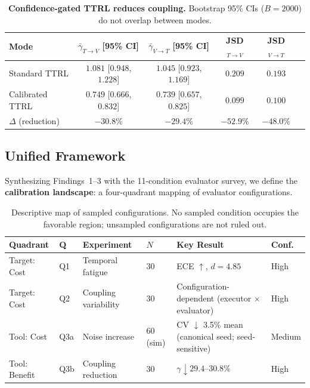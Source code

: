 \documentclass[11pt]{article}
\begin{document}
\begin{table}[H]
\centering
\caption{\textbf{Confidence-gated TTRL reduces coupling.} Bootstrap 95\% CIs ($B{=}2000$) do not overlap between modes.}
\label{tab:coupling}
\begin{tabular}{@{}lccccc@{}}
\toprule
Mode & $\bar{\gamma}_{T \to V}$ [95\% CI] & $\bar{\gamma}_{V \to T}$ [95\% CI] & JSD$_{T \to V}$ & JSD$_{V \to T}$ \\
\midrule
Standard TTRL & $1.081$ [$0.948$, $1.228$] & $1.045$ [$0.923$, $1.169$] & $0.209$ & $0.193$ \\
Calibrated TTRL & $0.749$ [$0.666$, $0.832$] & $0.739$ [$0.657$, $0.825$] & $0.099$ & $0.100$ \\
\midrule
$\Delta$ (reduction) & $-30.8\%$ & $-29.4\%$ & $-52.9\%$ & $-48.0\%$ \\
\bottomrule
\end{tabular}
\end{table}


\subsection{Unified Framework}

Synthesizing Findings~1--3 with the 11-condition evaluator survey, we define the \textbf{calibration landscape}: a four-quadrant mapping of evaluator configurations.

\begin{table}[H]
\centering
\caption{Descriptive map of sampled configurations. No sampled condition occupies the favorable region; unsampled configurations are not ruled out.}
\begin{tabularx}{\textwidth}{@{}l l X l X l@{}}
\toprule
Quadrant & Q & Experiment & $N$ & Key Result & Conf. \\
\midrule
Target: Cost & Q1 & Temporal fatigue & 30 & ECE $\uparrow$, $d{=}4.85$ & High \\
Target: Cost & Q2 & Coupling variability & 30 & Configuration-dependent (executor $\times$ evaluator) & High \\
Tool: Cost & Q3a & Noise increase & 60 (sim) & CV $\downarrow$ 3.5\% mean (canonical seed; seed-sensitive) & Medium \\
Tool: Benefit & Q3b & Coupling reduction & 30 & $\gamma \downarrow 29.4$--$30.8\%$ & High \\
\bottomrule
\end{tabularx}
\end{table}
\end{document}

